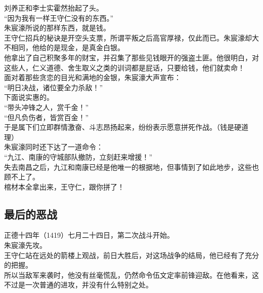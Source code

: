 \begin{multicols}{\theparacolNo}
刘养正和李士实霍然抬起了头。\\

“因为我有一样王守仁没有的东西。”\\

朱宸濠所说的那样东西，就是钱。\\

王守仁招兵的秘诀是开空头支票，所谓平叛之后高官厚禄，仅此而已。朱宸濠却大不相同，他给的是现金，是真金白银。\\

他拿出了自己积聚多年的财宝，并召集了那些见钱眼开的强盗土匪。他很明白，对这些人，仁义道德、舍生取义之类的训词都是屁话，只要给钱，他们就卖命！\\

面对着那些贪恋的目光和满地的金银，朱宸濠大声宣布：\\

“明日决战，诸位要全力杀敌！”\\

下面说实惠的。\\

“带头冲锋之人，赏千金！”\\

“但凡负伤者，皆赏百金！”\\

于是属下们立即群情激奋、斗志昂扬起来，纷纷表示愿意拼死作战。（钱是硬道理）\\

朱宸濠同时还下达了一道命令：\\

“九江、南康的守城部队撤防，立刻赶来增援！”\\

失去南昌之后，九江和南康已经是他唯一的根据地，但事情到了如此地步，这些也顾不上了。\\

棺材本全拿出来，王守仁，跟你拼了！\\

\subsection{最后的恶战}
正德十四年（1419）七月二十四日，第二次战斗开始。\\

朱宸濠先攻。\\

王守仁站在远处的箭楼上观战，前日大胜后，对这场战争的结局，他已经有了充分的把握。\\

所以当敌军来袭时，他没有丝毫慌乱，仍然命令伍文定率前锋迎敌。在他看来，这不过是一次普通的进攻，并没有什么特别之处。\\


\end{multicols}
